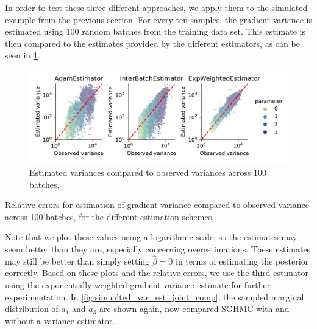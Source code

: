 In order to test these three different approaches, we apply them to the simulated example from the previous section.
For every ten samples, the gradient variance is estimated using 100 random batches from the training data set.
This estimate is then compared to the estimates provided by the different estimators, as can be seen in \cref{fig:est_variances_simulated}.
\begin{figure}[htbp]
    \centering
    \includegraphics[width=\linewidth]{Figures/simulated_sghmc_gradient_variance_estimations.pdf}
    \caption{Estimated variances compared to observed variances across 100 batches.}
    \label{fig:est_variances_simulated}
\end{figure}
\begin{table}[htbp]
    \centering
    
    \caption{Relative errors for estimation of gradient variance compared to observed variance across 100 batches, for the different estimation schemes,}
\end{table}
Note that we plot these values using a logarithmic scale, so the estimates may seem better than they are, especially concerning overestimations. 
These estimates may still be better than simply setting $\hat\beta=0$ in terms of estimating the posterior correctly.
Based on these plots and the relative errors, we use the third estimator using the exponentially weighted gradient variance estimate for further experimentation.
In \cref{fig:simualted_var_est_joint_comp}, the sampled marginal distribution of $a_1$ and $a_3$ are shown again, now compared SGHMC with and without a variance estimator.
